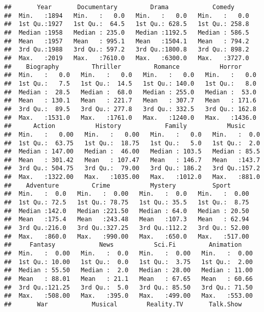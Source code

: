 \documentclass[
]{article}
\begin{document}
\begin{verbatim}
##       Year       Documentary         Drama            Comedy      
##  Min.   :1894   Min.   :   0.0   Min.   :   0.0   Min.   :   0.0  
##  1st Qu.:1927   1st Qu.:  64.5   1st Qu.: 628.5   1st Qu.: 258.8  
##  Median :1958   Median : 235.0   Median :1192.5   Median : 586.5  
##  Mean   :1957   Mean   : 995.1   Mean   :1504.1   Mean   : 794.2  
##  3rd Qu.:1988   3rd Qu.: 597.2   3rd Qu.:1800.8   3rd Qu.: 898.2  
##  Max.   :2019   Max.   :7610.0   Max.   :6300.0   Max.   :3727.0  
##    Biography         Thriller         Romance           Horror      
##  Min.   :   0.0   Min.   :   0.0   Min.   :   0.0   Min.   :   0.0  
##  1st Qu.:   7.5   1st Qu.:  14.5   1st Qu.: 140.0   1st Qu.:   8.0  
##  Median :  28.5   Median :  68.0   Median : 255.0   Median :  53.0  
##  Mean   : 130.1   Mean   : 221.7   Mean   : 307.7   Mean   : 171.6  
##  3rd Qu.:  89.5   3rd Qu.: 277.8   3rd Qu.: 332.5   3rd Qu.: 162.8  
##  Max.   :1531.0   Max.   :1761.0   Max.   :1240.0   Max.   :1436.0  
##      Action           History            Family           Music      
##  Min.   :   0.00   Min.   :   0.00   Min.   :   0.0   Min.   :  0.0  
##  1st Qu.:  63.75   1st Qu.:  18.75   1st Qu.:   5.0   1st Qu.:  2.0  
##  Median : 147.00   Median :  46.00   Median : 103.5   Median : 85.5  
##  Mean   : 301.42   Mean   : 107.47   Mean   : 146.7   Mean   :143.7  
##  3rd Qu.: 504.75   3rd Qu.:  79.00   3rd Qu.: 186.2   3rd Qu.:157.2  
##  Max.   :1322.00   Max.   :1035.00   Max.   :1012.0   Max.   :881.0  
##    Adventure         Crime           Mystery          Sport       
##  Min.   :  0.0   Min.   :  0.00   Min.   :  0.0   Min.   :  0.00  
##  1st Qu.: 72.5   1st Qu.: 78.75   1st Qu.: 35.5   1st Qu.:  8.75  
##  Median :142.0   Median :221.50   Median : 64.0   Median : 20.50  
##  Mean   :175.4   Mean   :243.48   Mean   :107.3   Mean   : 62.94  
##  3rd Qu.:216.0   3rd Qu.:327.25   3rd Qu.:112.2   3rd Qu.: 52.00  
##  Max.   :860.0   Max.   :990.00   Max.   :650.0   Max.   :517.00  
##     Fantasy            News           Sci.Fi         Animation     
##  Min.   :  0.00   Min.   :  0.0   Min.   :  0.00   Min.   :  0.00  
##  1st Qu.: 10.00   1st Qu.:  0.0   1st Qu.:  3.75   1st Qu.:  2.00  
##  Median : 55.50   Median :  2.0   Median : 28.00   Median : 11.00  
##  Mean   : 88.01   Mean   : 21.1   Mean   : 67.65   Mean   : 60.66  
##  3rd Qu.:121.25   3rd Qu.:  5.0   3rd Qu.: 85.50   3rd Qu.: 71.50  
##  Max.   :508.00   Max.   :395.0   Max.   :499.00   Max.   :553.00  
##       War            Musical        Reality.TV       Talk.Show    

\end{verbatim}
\end{document}
